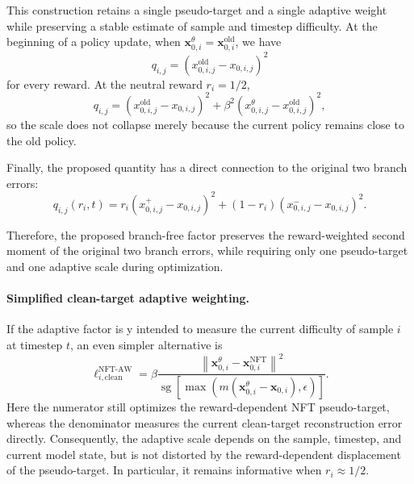 \documentclass{article} %
\begin{document}
This construction retains a single pseudo-target and a single adaptive weight
while preserving a stable estimate of sample and timestep difficulty. At the
beginning of a policy update, when
\(\mathbf{x}_{0,i}^{\theta}=\mathbf{x}_{0,i}^{\mathrm{old}}\), we have
\begin{equation}
q_{i,j}
=
\left(
x_{0,i,j}^{\mathrm{old}}
-
x_{0,i,j}
\right)^2
\end{equation}
for every reward. At the neutral reward \(r_i=1/2\),
\begin{equation}
q_{i,j}
=
\left(
x_{0,i,j}^{\mathrm{old}}
-
x_{0,i,j}
\right)^2
+
\beta^2
\left(
x_{0,i,j}^{\theta}
-
x_{0,i,j}^{\mathrm{old}}
\right)^2,
\end{equation}
so the scale does not collapse merely because the current policy remains close
to the old policy.

Finally, the proposed quantity has a direct connection to the original two
branch errors:
\begin{equation}
q_{i,j}(r_i,t)
=
r_i
\left(
x_{0,i,j}^{+}
-
x_{0,i,j}
\right)^2
+
(1-r_i)
\left(
x_{0,i,j}^{-}
-
x_{0,i,j}
\right)^2.
\label{eq:nft_branchfree_branch_identity}
\end{equation}

Therefore, the proposed branch-free factor preserves the reward-weighted
second moment of the original two branch errors, while requiring only one
pseudo-target and one adaptive scale during optimization.


\paragraph{Simplified clean-target adaptive weighting.}
If the adaptive factor is y intended to measure the current difficulty of
sample \(i\) at timestep \(t\), an even simpler alternative is
\begin{equation}
\label{eq:nft_clean_target_adaptive}
\ell_{i,\mathrm{clean}}^{\mathrm{NFT\text{-}AW}}
=
\beta
\frac{
\left\|
\mathbf{x}_{0,i}^{\theta}
-
\mathbf{x}_{0,i}^{\mathrm{NFT}}
\right\|^2
}{
\operatorname{sg}
\left[
\max
\left(
m\left(
\mathbf{x}_{0,i}^{\theta}
-
\mathbf{x}_{0,i}
\right),
\epsilon
\right)
\right]
}.
\end{equation}
Here the numerator still optimizes the reward-dependent NFT pseudo-target,
whereas the denominator measures the current clean-target reconstruction error
directly. Consequently, the adaptive scale depends on the sample, timestep,
and current model state, but is not distorted by the reward-dependent
displacement of the pseudo-target. In particular, it remains informative when
\(r_i\approx1/2\).
\end{document}
